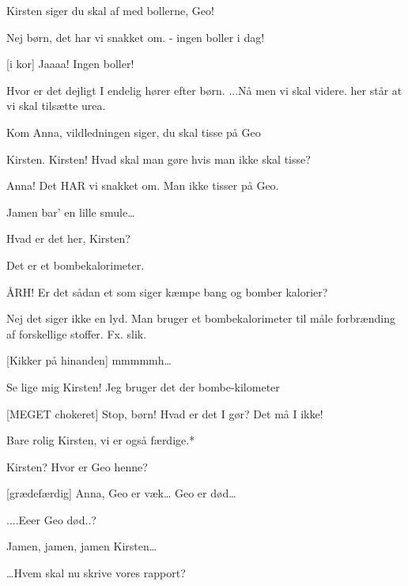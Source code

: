 \documentclass[a4paper,11pt]{article}
\begin{document}
\begin{sketch}
 Kirsten siger du skal af med bollerne, Geo!

 Nej børn, det har vi snakket om. - ingen boller i dag!

 [i kor] Jaaaa! Ingen boller!




 Hvor er det dejligt I endelig hører efter børn. ...Nå men vi skal videre. her står at vi skal tilsætte urea.

 Kom Anna, vildledningen siger, du skal tisse på Geo


 Kirsten. Kirsten! Hvad skal man gøre hvis man ikke skal tisse?

 Anna! Det HAR vi snakket om. Man ikke tisser på Geo.

 Jamen bar’ en lille smule…


  Hvad er det her, Kirsten?

 Det er et bombekalorimeter.


 ÅRH! Er det sådan et som siger kæmpe bang og bomber kalorier?

 Nej det siger ikke en lyd. Man bruger et bombekalorimeter til måle forbrænding af
forskellige stoffer. Fx. slik.

[Kikker på hinanden] mmmmmh…

 Se lige mig Kirsten! Jeg bruger det der bombe-kilometer 


[MEGET chokeret] Stop, børn! Hvad er det I gør? Det må I ikke!


 Bare rolig Kirsten, vi er også færdige.*




 Kirsten? Hvor er Geo henne?

[grædefærdig] Anna, Geo er væk… Geo er død…

 ....Eeer Geo død..?

 Jamen, jamen, jamen Kirsten…

 …Hvem skal nu skrive vores rapport?


\end{sketch}
\end{document}
